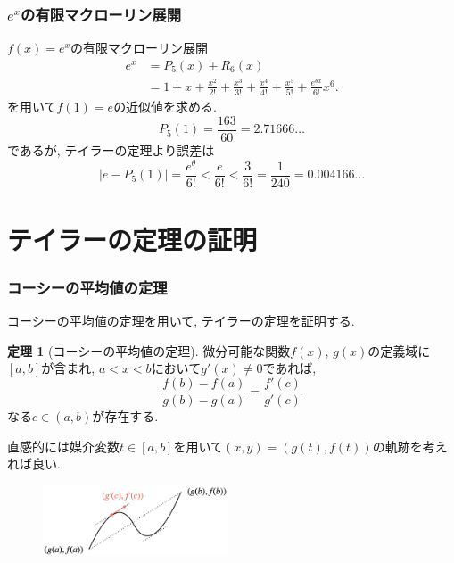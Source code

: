 \documentclass[dvipdfmx,cjk,10.2pt]{beamer}
\theoremstyle{definition}
\newtheorem{Thm}{定理}[section]
\begin{document}





\begin{frame}
\frametitle{$e^x$の有限マクローリン展開}

$f(x)=e^x$の有限マクローリン展開
\begin{align*}
e^x &= P_5(x)+R_6(x) \\
& = 1+x+\frac{x^2}{2!}+\frac{x^3}{3!}+\frac{x^4}{4!}+\frac{x^5}{5!}+\frac{e^{\theta x}}{6!}x^6. 
\end{align*}
を用いて$f(1)=e$の近似値を求める. 
$$
P_5(1)=\frac{163}{60}=2.71666\dots
$$
であるが, テイラーの定理より誤差は
$$
|e-P_5(1)|=\frac{e^\theta}{6!}<\frac{e}{6!}<\frac{3}{6!}=\frac{1}{240}=0.004166\dots
$$

\end{frame}






\section{テイラーの定理の証明}

\begin{frame}
\frametitle{コーシーの平均値の定理}

コーシーの平均値の定理を用いて, テイラーの定理を証明する. 

\begin{Thm}[コーシーの平均値の定理] 
微分可能な関数$f(x)$, $g(x)$の定義域に$[a,b]$が含まれ, $a<x<b$において$g'(x) \ne 0$であれば, 
$$
\frac{f(b)-f(a)}{g(b)-g(a)}=\frac{f'(c)}{g'(c)}
$$
なる$c \in (a,b)$が存在する. 
\end{Thm}

直感的には媒介変数$t \in [a,b]$を用いて$(x,y)=(g(t),f(t))$の軌跡を考えれば良い. 

\vspace{-5mm}

 \begin{figure}[htbp]
 \begin{center} 
  \includegraphics[width=55mm]{CauchyMean.png}
 \end{center}
\end{figure}

\end{frame}
\end{document}
